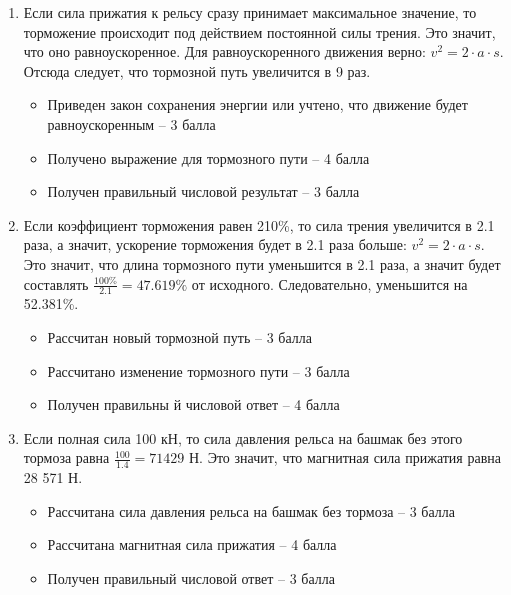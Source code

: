 \solutionSection

\begin{enumerate}
    \item Если сила прижатия к рельсу сразу принимает максимальное значение, то торможение происходит под действием постоянной силы трения. Это значит, что оно равноускоренное. Для равноускоренного движения верно: $v^2=2 \cdot a \cdot s$.
    Отсюда следует, что тормозной путь увеличится в 9 раз. 

    \markSection

    \begin{itemize}
        \item Приведен закон сохранения энергии или учтено, что движение будет равноускоренным – 3 балла
        \item Получено выражение для тормозного пути – 4 балла
        \item Получен правильный числовой результат – 3 балла
    \end{itemize}

    \item Если коэффициент торможения равен 210\%, то сила трения увеличится в 2.1 раза, а значит, ускорение торможения будет в 2.1 раза больше: $v^2=2 \cdot a \cdot s$.
    Это значит, что длина тормозного пути уменьшится в 2.1 раза, а значит будет составлять $\frac{100 \%}{2.1}=47.619\%$ от исходного. Следовательно, уменьшится на 52.381\%.

    \markSection

    \begin{itemize}
	    \item Рассчитан новый тормозной путь – 3 балла
	    \item Рассчитано изменение тормозного пути – 3 балла
	    \item Получен правильны й числовой ответ – 4 балла
    \end{itemize}

    \item Если полная сила 100 кН, то сила давления рельса на башмак без этого тормоза равна $\frac{100}{1.4} = 71 429$ Н.  Это значит, что магнитная сила прижатия равна 28 571 Н.
    

    \markSection

    \begin{itemize}
	    \item Рассчитана сила давления рельса на башмак без тормоза – 3 балла
	    \item Рассчитана магнитная сила прижатия – 4 балла
	    \item Получен правильный числовой ответ – 3 балла
    \end{itemize}


\end{enumerate}
